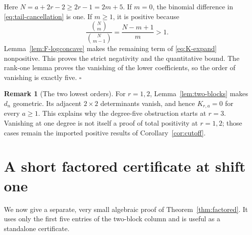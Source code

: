 \documentclass[11pt,a4paper]{article}
\theoremstyle{definition}
\newtheorem{remark}[theorem]{Remark}
\numberwithin{equation}{section}
\begin{document}
Here $N=a+2r-2\ge2r-1=2m+5$. If $m=0$, the binomial difference in
\eqref{eq:tail-cancellation} is one. If $m\ge1$, it is positive because
\[
 \frac{\binom Nm}{\binom N{m-1}}=\frac{N-m+1}{m}>1.
\]
Lemma~\ref{lem:F-logconcave} makes the remaining term of
\eqref{eq:K-expand} nonpositive. This proves the strict negativity and
the quantitative bound. The rank-one lemma proves the vanishing of the
lower coefficients, so the order of vanishing is exactly five.
\hfill$\square$

\begin{remark}[The two lowest orders]
For $r=1,2$, Lemma~\ref{lem:two-blocks} makes $d_n$ geometric. Its adjacent
$2\times2$ determinants vanish, and hence $K_{r,a}=0$ for every $a\ge1$.
This explains why the degree-five obstruction starts at $r=3$.
Vanishing at one degree is not itself a proof of total positivity at
$r=1,2$; those cases remain the imported positive results of
Corollary~\ref{cor:cutoff}.
\end{remark}

\section{A short factored certificate at shift one}
\label{sec:factor}

We now give a separate, very small algebraic proof of
Theorem~\ref{thm:factored}. It uses only the first five entries of the
two-block column and is useful as a standalone certificate.
\end{document}
